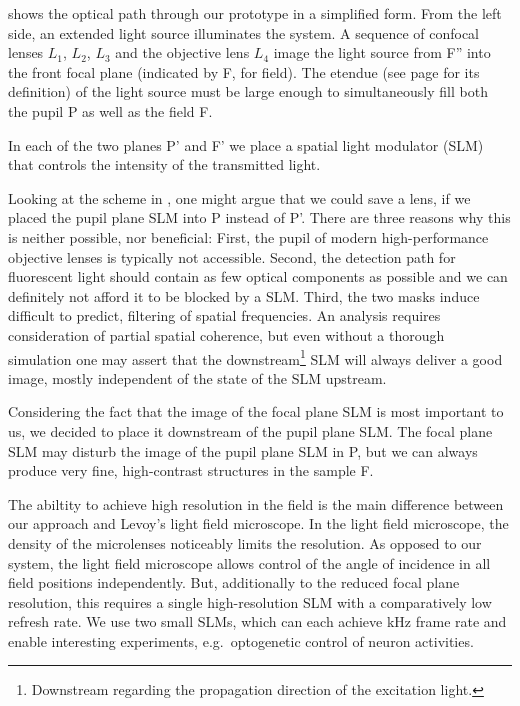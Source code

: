 shows the optical path through our prototype
in a simplified form.  From the left side, an extended light source
illuminates the system. A sequence of confocal lenses $L_1$, $L_2$,
$L_3$ and the objective lens $L_4$ image the light source from F''
into the front focal plane (indicated by F, for field). The etendue
(see page \pageref{sec:etendue} for its definition) of the light
source must be large enough to simultaneously fill both the pupil P as
well as the field F.

In each of the two planes P' and F' we place a spatial light modulator
(SLM) that controls the intensity of the transmitted light.

Looking at the scheme in , one might argue
that we could save a lens, if we placed the pupil plane SLM into P
instead of P'. There are three reasons why this is neither possible,
nor beneficial: First, the pupil of modern high-performance objective
lenses is typically not accessible. Second, the detection path for
fluorescent light should contain as few optical components as possible
and we can definitely not afford it to be blocked by a SLM.  Third,
the two masks induce  difficult to predict,
filtering of spatial frequencies. An analysis requires consideration
of partial spatial coherence, but even without a thorough simulation
one may assert that the downstream\footnote{Downstream regarding the
  propagation direction of the excitation light.} SLM will always
deliver a good image, mostly independent of the state of the SLM
upstream.

Considering the fact that the image of the focal plane SLM is most
important to us, we decided to place it downstream of the pupil plane
SLM. The focal plane SLM may disturb the image of the pupil plane SLM
in P, but we can always produce very fine, high-contrast structures in
the sample F.

The abiltity to achieve high resolution in the field is the main
difference between our approach and Levoy's light field microscope.  In
the light field microscope, the density of the microlenses noticeably
limits the resolution. As opposed to our system, the light field
microscope allows control of the angle of incidence in all field
positions independently.  But, additionally to the reduced focal plane
resolution, this requires a single high-resolution SLM with a
comparatively low refresh rate. We use two small SLMs, which can each
achieve \unit[1]{kHz} frame rate and enable interesting experiments,
e.g.\ optogenetic control of neuron activities.

